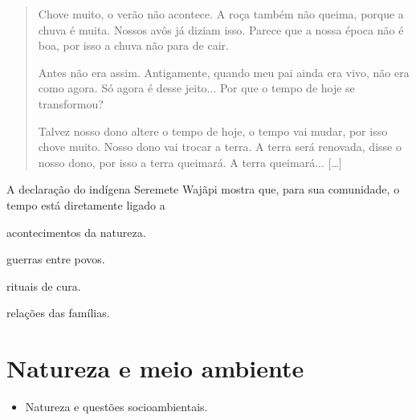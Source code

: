 \begin{quote}
Chove muito, o verão não acontece. A roça também não queima, porque a
chuva é muita. Nossos avôs já diziam isso. Parece que a nossa época não
é boa, por isso a chuva não para de cair.

Antes não era assim. Antigamente, quando meu pai ainda era vivo, não era
como agora. Só agora é desse jeito... Por que o tempo de hoje se
transformou?

Talvez nosso dono altere o tempo de hoje, o tempo vai mudar, por isso
chove muito. Nosso dono vai trocar a terra. A terra será renovada, disse
o nosso dono, por isso a terra queimará. A terra queimará... {[}\ldots{}{]}

\end{quote}

A declaração do indígena Seremete Wajãpi mostra que, para sua comunidade, o tempo está diretamente ligado a

\begin{minipage}{.5\textwidth}
\begin{escolha}
\item acontecimentos da natureza.

\item guerras entre povos.

\item rituais de cura.

\item relações das famílias.
\end{escolha}
\end{minipage}

\chapter{Natureza e meio ambiente}



\begin{itemize}
\item Natureza e questões socioambientais.
\end{itemize}

